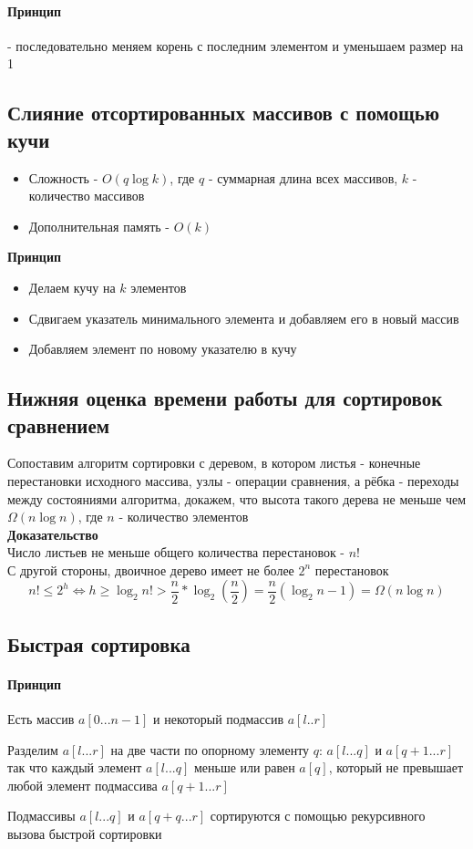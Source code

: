 \documentclass[a4paper,10pt]{article}
\begin{document}
	\paragraph{Принцип} - последовательно меняем корень с последним элементом и уменьшаем размер на 1
	\subsection{Слияние отсортированных массивов с помощью кучи}
	\begin{itemize}
		\item Сложность - $O(q\log k)$, где $q$ - суммарная длина всех массивов, $k$ - количество массивов
		\item Дополнительная память - $O(k)$
	\end{itemize}
	\begin{center}
		\textbf{Принцип}
	\end{center}
	\begin{itemize}
		\item Делаем кучу на $k$ элементов
		\item Сдвигаем указатель минимального элемента и добавляем его в новый массив
		\item Добавляем элемент по новому указателю в кучу
	\end{itemize}
	\subsection{Нижняя оценка времени работы для сортировок сравнением}
	Сопоставим алгоритм сортировки с деревом, в котором листья - конечные перестановки исходного массива, узлы - операции сравнения, а рёбка - переходы между состояниями алгоритма, докажем, что высота такого дерева не меньше чем $\Omega(n \log n)$, где $n$ - количество элементов \\
	\textbf{Доказательство} \\
	Число листьев не меньше общего количества перестановок - $n!$ \\
	С другой стороны, двоичное дерево имеет не более $2^n$ перестановок \\
	\[
		n! \leq 2^h \Leftrightarrow h \geq \log_2 n! > \frac{n}{2}*\log_2(\frac{n}{2}) = \frac{n}{2}(\log_2 n - 1) = \Omega(n \log n)
	\]
	\subsection{Быстрая сортировка}
	\paragraph{Принцип}
	Есть массив $a[0...n-1]$ и некоторый подмассив $a[l..r]$
	\begin{center}
		\item Разделим $a[l...r]$ на две части по опорному элементу $q$: $a[l...q]$ и $a[q+1...r]$ так что каждый элемент $a[l...q]$ меньше или равен $a[q]$, который не превышает любой элемент подмассива $a[q+1...r]$
		\item Подмассивы $a[l...q]$ и $a[q+q...r]$ сортируются с помощью рекурсивного вызова быстрой сортировки
	\end{center}
\end{document}
